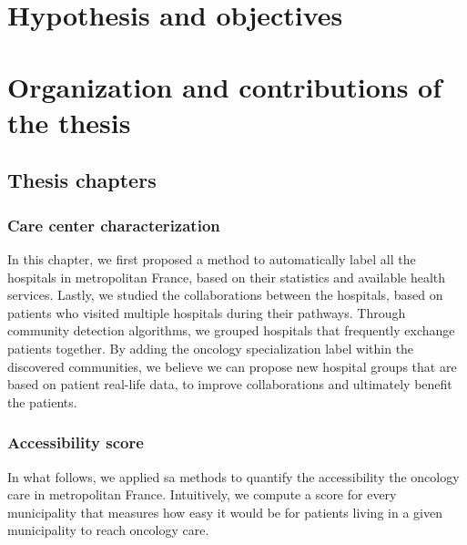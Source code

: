 \section{Hypothesis and objectives}

\section{Organization and contributions of the thesis}

\subsection{Thesis chapters}

\subsubsection{Care center characterization}
In this chapter, we first proposed a method to automatically label
all the hospitals in metropolitan France, based on their statistics and
available health services. Lastly, we studied the collaborations between
the hospitals, based on patients who visited multiple hospitals during their
pathways. Through community detection algorithms, we grouped hospitals that
frequently exchange patients together. By adding the oncology specialization
label within the discovered communities, we believe we can propose new
hospital groups that are based on patient real-life data, to improve
collaborations and ultimately benefit the patients.

\subsubsection{Accessibility score}
In what follows, we applied \ac{sa} methods to
quantify the accessibility the oncology care in metropolitan France.
Intuitively, we compute a score for every municipality that measures how easy it
would be for patients living in a given municipality to reach oncology care.

